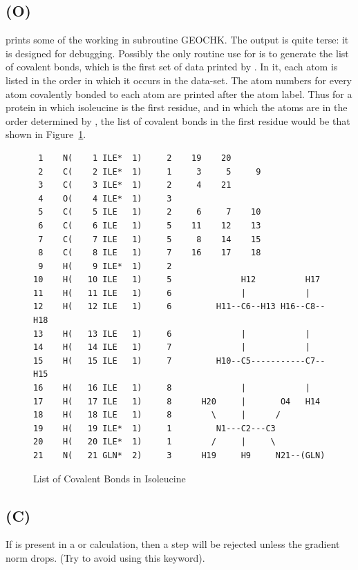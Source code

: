 \subsection*{ (O)}
 prints some of the working in subroutine GEOCHK.  The output
is quite terse: it is designed for debugging.  Possibly the only routine
use for  is to generate the list of covalent bonds, which
is the first set of data printed by .  In it, each atom is listed
in the order in which it occurs in the data-set.  The atom numbers for every
atom covalently bonded to each atom are printed after the atom label.
Thus for a protein in which isoleucine is the first residue,
and in which the atoms are in the order determined by
, the list of covalent bonds in the first residue
would be that shown in Figure~\ref{ile}.
\begin{figure}
\begin{makeimage}
\end{makeimage}
\begin{verbatim}
 1    N(    1 ILE*  1)     2    19    20
 2    C(    2 ILE*  1)     1     3     5     9
 3    C(    3 ILE*  1)     2     4    21
 4    O(    4 ILE*  1)     3
 5    C(    5 ILE   1)     2     6     7    10
 6    C(    6 ILE   1)     5    11    12    13
 7    C(    7 ILE   1)     5     8    14    15
 8    C(    8 ILE   1)     7    16    17    18
 9    H(    9 ILE*  1)     2
10    H(   10 ILE   1)     5              H12          H17
11    H(   11 ILE   1)     6              |            |
12    H(   12 ILE   1)     6         H11--C6--H13 H16--C8--H18
13    H(   13 ILE   1)     6              |            |
14    H(   14 ILE   1)     7              |            |
15    H(   15 ILE   1)     7         H10--C5-----------C7--H15
16    H(   16 ILE   1)     8              |            |
17    H(   17 ILE   1)     8      H20     |       O4   H14
18    H(   18 ILE   1)     8        \     |      /
19    H(   19 ILE*  1)     1         N1---C2---C3
20    H(   20 ILE*  1)     1        /     |     \
21    N(   21 GLN*  2)     3      H19     H9     N21--(GLN)
\end{verbatim}
\caption{\label{ile} List of Covalent Bonds in Isoleucine}
\end{figure}

\subsection*{ (C)}
If  is present in a  or  calculation, then a step
will be rejected unless the gradient norm drops.  (Try to avoid using this keyword).


